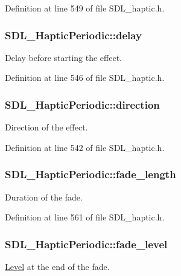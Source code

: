 Definition at line 549 of file S\-D\-L\-\_\-haptic.\-h.

\hypertarget{struct_s_d_l___haptic_periodic_a8688d1c7ee6270ed290f6b474aef5ec9}{
\subsubsection[{delay}]{ S\-D\-L\-\_\-\-Haptic\-Periodic\-::delay}}\label{struct_s_d_l___haptic_periodic_a8688d1c7ee6270ed290f6b474aef5ec9}
Delay before starting the effect. 

Definition at line 546 of file S\-D\-L\-\_\-haptic.\-h.

\hypertarget{struct_s_d_l___haptic_periodic_a2c4f27d4583187a7a994e79ad49083d3}{
\subsubsection[{direction}]{ S\-D\-L\-\_\-\-Haptic\-Periodic\-::direction}}\label{struct_s_d_l___haptic_periodic_a2c4f27d4583187a7a994e79ad49083d3}
Direction of the effect. 

Definition at line 542 of file S\-D\-L\-\_\-haptic.\-h.

\hypertarget{struct_s_d_l___haptic_periodic_ae1c186d02304eae142a62dca72f50fa8}{
\subsubsection[{fade\-\_\-length}]{ S\-D\-L\-\_\-\-Haptic\-Periodic\-::fade\-\_\-length}}\label{struct_s_d_l___haptic_periodic_ae1c186d02304eae142a62dca72f50fa8}
Duration of the fade. 

Definition at line 561 of file S\-D\-L\-\_\-haptic.\-h.

\hypertarget{struct_s_d_l___haptic_periodic_afa7713fc264959873f2a852fca4174fd}{
\subsubsection[{fade\-\_\-level}]{ S\-D\-L\-\_\-\-Haptic\-Periodic\-::fade\-\_\-level}}\label{struct_s_d_l___haptic_periodic_afa7713fc264959873f2a852fca4174fd}
\hyperlink{class_level}{Level} at the end of the fade. 

